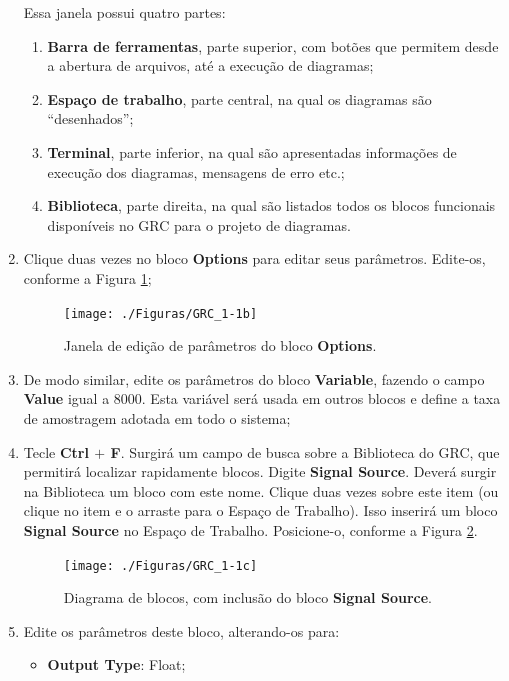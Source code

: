 \documentclass[12pt,addpoints]{exam}
\begin{document}
\begin{enumerate}
    Essa janela possui quatro partes:
    \begin{enumerate}
        \item \textbf{Barra de ferramentas}, parte superior, com botões que permitem desde a abertura de arquivos, até a execução de diagramas;
        \item \textbf{Espaço de trabalho}, parte central, na qual os diagramas são ``desenhados'';
        \item \textbf{Terminal}, parte inferior, na qual são apresentadas informações de execução dos diagramas, mensagens de erro etc.;
        \item \textbf{Biblioteca}, parte direita, na qual são listados todos os blocos funcionais disponíveis no GRC para o projeto de diagramas.
    \end{enumerate}
    \item Clique duas vezes no bloco \textbf{Options} para editar seus parâmetros. Edite-os, conforme a Figura \ref{fig:GRC_1-1b};
    \begin{figure}[htb]
        \centering
        \texttt{[image: ./Figuras/GRC\_1-1b]} \\
        \caption{Janela de edição de parâmetros do bloco \textbf{Options}.} 
        \label{fig:GRC_1-1b}
    \end{figure}
    \item De modo similar, edite os parâmetros do bloco \textbf{Variable}, fazendo o campo \textbf{Value} igual a 8000. Esta variável será usada em outros blocos e define a taxa de amostragem adotada em todo o sistema;
    \item Tecle \textbf{Ctrl $+$ F}. Surgirá um campo de busca sobre a Biblioteca do GRC, que permitirá localizar rapidamente blocos. Digite \textbf{Signal Source}. Deverá surgir na Biblioteca um bloco com este nome. Clique duas vezes sobre este item (ou clique no item e o arraste para o Espaço de Trabalho). Isso inserirá um bloco \textbf{Signal Source} no Espaço de Trabalho. Posicione-o, conforme a Figura \ref{fig:GRC_1-1c}.
    \begin{figure}[htb]
        \centering
        \texttt{[image: ./Figuras/GRC\_1-1c]} \\
        \caption{Diagrama de blocos, com inclusão do bloco \textbf{Signal Source}.} 
        \label{fig:GRC_1-1c}
    \end{figure}
    \item Edite os parâmetros deste bloco, alterando-os para:
    \begin{itemize}
        \item \textbf{Output Type}: Float;

\end{itemize}
\end{enumerate}
\end{document}
